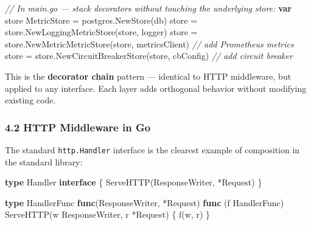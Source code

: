 \documentclass[
]{article}
\newenvironment{Shaded}{}{}
\newcommand{\CommentTok}[1]{\textcolor[rgb]{0.38,0.63,0.69}{\textit{#1}}}
\newcommand{\KeywordTok}[1]{\textcolor[rgb]{0.00,0.44,0.13}{\textbf{#1}}}
\newcommand{\NormalTok}[1]{#1}
\newcommand{\OperatorTok}[1]{\textcolor[rgb]{0.40,0.40,0.40}{#1}}
\begin{document}
\begin{Shaded}
\begin{Highlighting}[]
\CommentTok{// In main.go — stack decorators without touching the underlying store:}
\KeywordTok{var}\NormalTok{ store MetricStore }\OperatorTok{=}\NormalTok{ postgres}\OperatorTok{.}\NormalTok{NewStore}\OperatorTok{(}\NormalTok{db}\OperatorTok{)}
\NormalTok{store }\OperatorTok{=}\NormalTok{ store}\OperatorTok{.}\NormalTok{NewLoggingMetricStore}\OperatorTok{(}\NormalTok{store}\OperatorTok{,}\NormalTok{ logger}\OperatorTok{)}
\NormalTok{store }\OperatorTok{=}\NormalTok{ store}\OperatorTok{.}\NormalTok{NewMetricMetricStore}\OperatorTok{(}\NormalTok{store}\OperatorTok{,}\NormalTok{ metricsClient}\OperatorTok{)} \CommentTok{// add Prometheus metrics}
\NormalTok{store }\OperatorTok{=}\NormalTok{ store}\OperatorTok{.}\NormalTok{NewCircuitBreakerStore}\OperatorTok{(}\NormalTok{store}\OperatorTok{,}\NormalTok{ cbConfig}\OperatorTok{)}    \CommentTok{// add circuit breaker}
\end{Highlighting}
\end{Shaded}

This is the \textbf{decorator chain} pattern --- identical to HTTP
middleware, but applied to any interface. Each layer adds orthogonal
behavior without modifying existing code.

\hypertarget{http-middleware-in-go}{%
\subsubsection{4.2 HTTP Middleware in Go}\label{http-middleware-in-go}}

The standard \texttt{http.Handler} interface is the clearest example of
composition in the standard library:

\begin{Shaded}
\begin{Highlighting}[]
\KeywordTok{type}\NormalTok{ Handler }\KeywordTok{interface} \OperatorTok{\{}
\NormalTok{    ServeHTTP}\OperatorTok{(}\NormalTok{ResponseWriter}\OperatorTok{,} \OperatorTok{*}\NormalTok{Request}\OperatorTok{)}
\OperatorTok{\}}

\KeywordTok{type}\NormalTok{ HandlerFunc }\KeywordTok{func}\OperatorTok{(}\NormalTok{ResponseWriter}\OperatorTok{,} \OperatorTok{*}\NormalTok{Request}\OperatorTok{)}
\KeywordTok{func} \OperatorTok{(}\NormalTok{f HandlerFunc}\OperatorTok{)}\NormalTok{ ServeHTTP}\OperatorTok{(}\NormalTok{w ResponseWriter}\OperatorTok{,}\NormalTok{ r }\OperatorTok{*}\NormalTok{Request}\OperatorTok{)} \OperatorTok{\{}\NormalTok{ f}\OperatorTok{(}\NormalTok{w}\OperatorTok{,}\NormalTok{ r}\OperatorTok{)} \OperatorTok{\}}
\end{Highlighting}
\end{Shaded}
\end{document}
